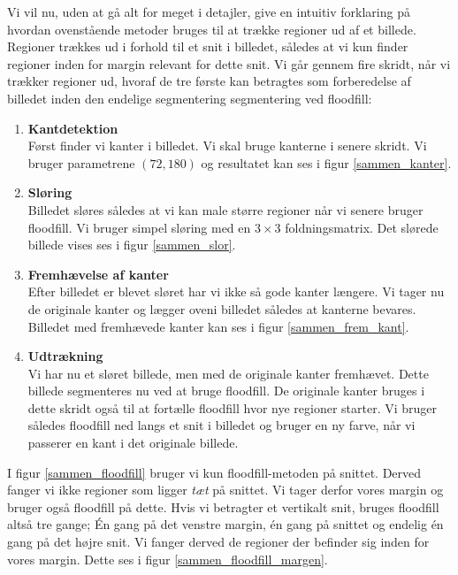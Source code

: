 {

Vi vil nu, uden at gå alt for meget i detajler, give en intuitiv
forklaring på hvordan ovenstående metoder bruges til at trække regioner
ud af et billede.  Regioner trækkes ud i forhold til et snit i billedet,
således at vi kun finder regioner inden for margin relevant for dette
snit. Vi går gennem fire skridt, når vi trækker regioner ud, hvoraf de
tre første kan betragtes som forberedelse af billedet inden den endelige
segmentering segmentering ved floodfill:

\begin{enumerate}
    \item \textbf{Kantdetektion}\\
Først finder vi kanter i billedet. Vi skal bruge kanterne i senere
skridt. Vi bruger parametrene $(72, 180)$ og resultatet kan ses i figur
\ref{sammen_kanter}.

\item \textbf{Sløring}\\
Billedet sløres således at vi kan male større regioner når vi senere
bruger floodfill. Vi bruger simpel sløring med en $3\times3$
foldningsmatrix. Det slørede billede vises ses i figur
\ref{sammen_slor}.

\item \textbf{Fremhævelse af kanter}\\
Efter billedet er blevet sløret har vi ikke så gode kanter længere. Vi
tager nu de originale kanter og lægger oveni billedet således at
kanterne bevares. Billedet med fremhævede kanter kan ses i figur
\ref{sammen_frem_kant}.

\item \textbf{Udtrækning}\\
Vi har nu et sløret billede, men med de originale kanter fremhævet.
Dette billede segmenteres nu ved at bruge floodfill. De originale kanter
bruges i dette skridt også til at fortælle floodfill hvor nye regioner
starter. Vi bruger således floodfill ned langs et snit i billedet og
bruger en ny farve, når vi passerer en kant i det originale billede.
\end{enumerate}

I figur \ref{sammen_floodfill} bruger vi kun floodfill-metoden på
snittet. Derved fanger vi ikke regioner som ligger \emph{tæt} på
snittet. Vi tager derfor vores margin og bruger også floodfill på dette.
Hvis vi betragter et vertikalt snit, bruges floodfill altså tre gange;
Én gang på det venstre margin, én gang på snittet og endelig én gang på
det højre snit. Vi fanger derved de regioner der befinder sig inden for
vores margin. Dette ses i figur \ref{sammen_floodfill_margen}.

}
